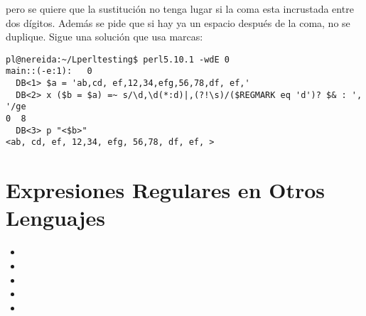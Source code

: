 pero se quiere que la sustitución no tenga lugar si la coma esta
incrustada entre dos dígitos. Además se pide que si hay ya un espacio
después de la coma, no se duplique. Sigue una solución que
usa marcas:

\begin{verbatim}
pl@nereida:~/Lperltesting$ perl5.10.1 -wdE 0
main::(-e:1):   0
  DB<1> $a = 'ab,cd, ef,12,34,efg,56,78,df, ef,'
  DB<2> x ($b = $a) =~ s/\d,\d(*:d)|,(?!\s)/($REGMARK eq 'd')? $& : ', '/ge
0  8
  DB<3> p "<$b>"
<ab, cd, ef, 12,34, efg, 56,78, df, ef, >
\end{verbatim}




\section{Expresiones Regulares en Otros Lenguajes}
\label{section:otroslenguajes}


\begin{itemize}
\item {}
\item  {}
\item {}
\item {}
\item {}
\end{itemize}


